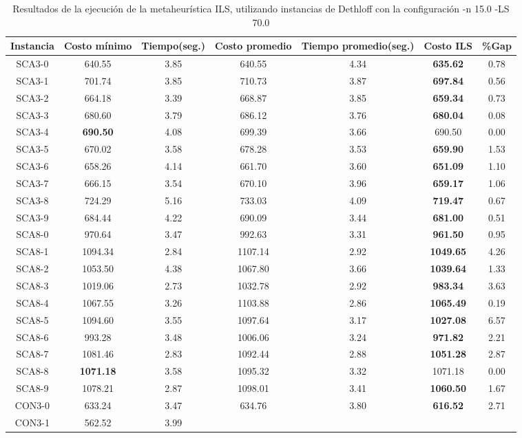 \begin{table}[ht]
\caption{Resultados de la ejecución de la metaheurística ILS, utilizando instancias de Dethloff con la configuración -n 15.0 -LS 70.0}
\centering
\small
\begin{tabular}{c c c c c c c}
\hline\hline
Instancia & Costo mínimo & Tiempo(seg.) & Costo promedio & Tiempo promedio(seg.) & Costo ILS & \%Gap \\ [0.5ex]
\hline
SCA3-0 & 640.55 & 3.85 & 
640.55 & 4.34 & \bf{635.62} & 
0.78\\SCA3-1 & 701.74 & 3.85 & 
710.73 & 3.87 & \bf{697.84} & 
0.56\\SCA3-2 & 664.18 & 3.39 & 
668.87 & 3.85 & \bf{659.34} & 
0.73\\SCA3-3 & 680.60 & 3.79 & 
686.12 & 3.76 & \bf{680.04} & 
0.08\\SCA3-4 & \bf{690.50} & 4.08 & 
699.39 & 3.66 & 690.50 & 0.00\\
SCA3-5 & 670.02 & 3.58 & 
678.28 & 3.53 & \bf{659.90} & 
1.53\\SCA3-6 & 658.26 & 4.14 & 
661.70 & 3.60 & \bf{651.09} & 
1.10\\SCA3-7 & 666.15 & 3.54 & 
670.10 & 3.96 & \bf{659.17} & 
1.06\\SCA3-8 & 724.29 & 5.16 & 
733.03 & 4.09 & \bf{719.47} & 
0.67\\SCA3-9 & 684.44 & 4.22 & 
690.09 & 3.44 & \bf{681.00} & 
0.51\\SCA8-0 & 970.64 & 3.47 & 
992.63 & 3.31 & \bf{961.50} & 
0.95\\SCA8-1 & 1094.34 & 2.84 & 
1107.14 & 2.92 & \bf{1049.65} & 
4.26\\SCA8-2 & 1053.50 & 4.38 & 
1067.80 & 3.66 & \bf{1039.64} & 
1.33\\SCA8-3 & 1019.06 & 2.73 & 
1032.78 & 2.92 & \bf{983.34} & 
3.63\\SCA8-4 & 1067.55 & 3.26 & 
1103.88 & 2.86 & \bf{1065.49} & 
0.19\\SCA8-5 & 1094.60 & 3.55 & 
1097.64 & 3.17 & \bf{1027.08} & 
6.57\\SCA8-6 & 993.28 & 3.48 & 
1006.06 & 3.24 & \bf{971.82} & 
2.21\\SCA8-7 & 1081.46 & 2.83 & 
1092.44 & 2.88 & \bf{1051.28} & 
2.87\\SCA8-8 & \bf{1071.18} & 3.58 & 
1095.32 & 3.32 & 1071.18 & 0.00\\
SCA8-9 & 1078.21 & 2.87 & 
1098.01 & 3.41 & \bf{1060.50} & 
1.67\\CON3-0 & 633.24 & 3.47 & 
634.76 & 3.80 & \bf{616.52} & 
2.71\\CON3-1 & 562.52 & 3.99 & 

\end{tabular}
\end{table}
